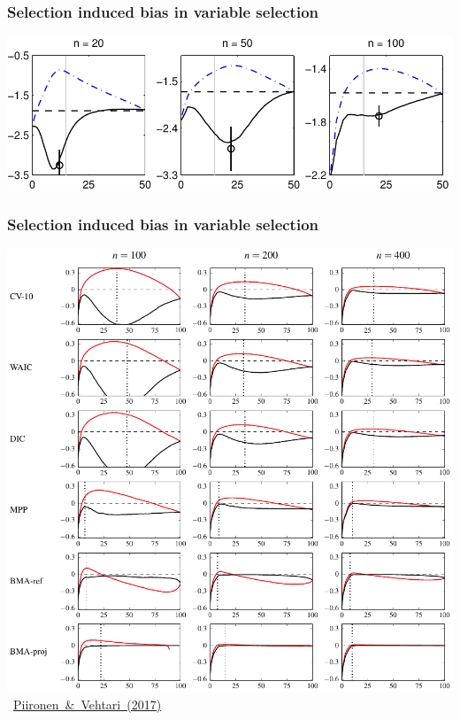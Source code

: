 \documentclass[10pt]{beamer}
\begin{document}
\begin{frame}

\frametitle{Selection induced bias in variable selection}

  \includegraphics[width=\textwidth]{figs/cv.pdf}

\end{frame}

\begin{frame}

\frametitle{Selection induced bias in variable selection}

  \includegraphics[height=0.88\textheight]{figs/simulated_searchpath.pdf}
   \vspace{-1.5\baselineskip}
   \mbox{{\hspace{8cm} \footnotesize \href{http://link.springer.com/article/10.1007/s11222-016-9649-y}{Piironen \& Vehtari (2017)}}}

\end{frame}
\end{document}
